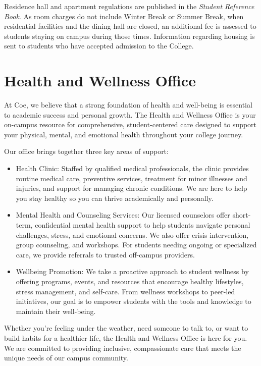 \documentclass[
  letterpaper,
]{scrbook}
\providecommand{\tightlist}{%
  \setlength{\itemsep}{0pt}\setlength{\parskip}{0pt}}
\begin{document}
Residence hall and apartment regulations are published in the
\emph{Student Reference Book}. As room charges do not include Winter
Break or Summer Break, when residential facilities and the dining hall
are closed, an additional fee is assessed to students staying on campus
during those times. Information regarding housing is sent to students
who have accepted admission to the College.

\section{Health and Wellness Office}\label{health-and-wellness-office}

At Coe, we believe that a strong foundation of health and well-being is
essential to academic success and personal growth. The Health and
Wellness Office is your on-campus resource for comprehensive,
student-centered care designed to support your physical, mental, and
emotional health throughout your college journey.

Our office brings together three key areas of support:

\begin{itemize}
\tightlist
\item
  Health Clinic: Staffed by qualified medical professionals, the clinic
  provides routine medical care, preventive services, treatment for
  minor illnesses and injuries, and support for managing chronic
  conditions. We are here to help you stay healthy so you can thrive
  academically and personally.
\item
  Mental Health and Counseling Services: Our licensed counselors offer
  short-term, confidential mental health support to help students
  navigate personal challenges, stress, and emotional concerns. We also
  offer crisis intervention, group counseling, and workshops. For
  students needing ongoing or specialized care, we provide referrals to
  trusted off-campus providers.
\item
  Wellbeing Promotion: We take a proactive approach to student wellness
  by offering programs, events, and resources that encourage healthy
  lifestyles, stress management, and self-care. From wellness workshops
  to peer-led initiatives, our goal is to empower students with the
  tools and knowledge to maintain their well-being.
\end{itemize}

Whether you're feeling under the weather, need someone to talk to, or
want to build habits for a healthier life, the Health and Wellness
Office is here for you. We are committed to providing inclusive,
compassionate care that meets the unique needs of our campus community.
\end{document}
